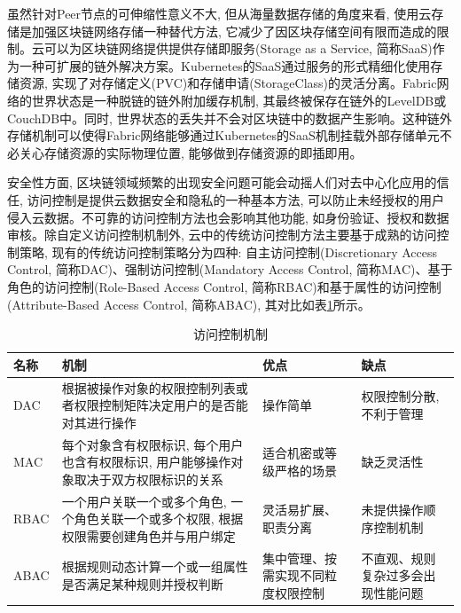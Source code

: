 虽然针对Peer节点的可伸缩性意义不大, 但从海量数据存储的角度来看, 使用云存储是加强区块链网络存储一种替代方法, 它减少了因区块存储空间有限而造成的限制\cite{gai2020blockchain}。云可以为区块链网络提供提供存储即服务(Storage as a Service, 简称SaaS)作为一种可扩展的链外解决方案。Kubernetes的SaaS通过服务的形式精细化使用存储资源, 实现了对存储定义(PVC)和存储申请(StorageClass)的灵活分离。Fabric网络的世界状态是一种脱链的链外附加缓存机制, 其最终被保存在链外的LevelDB或CouchDB中。同时, 世界状态的丢失并不会对区块链中的数据产生影响。这种链外存储机制可以使得Fabric网络能够通过Kubernetes的SaaS机制挂载外部存储单元不必关心存储资源的实际物理位置, 能够做到存储资源的即插即用。 

安全性方面, 区块链领域频繁的出现安全问题可能会动摇人们对去中心化应用的信任, 访问控制是提供云数据安全和隐私的一种基本方法, 可以防止未经授权的用户侵入云数据。不可靠的访问控制方法也会影响其他功能, 如身份验证、授权和数据审核。除自定义访问控制机制外, 云中的传统访问控制方法主要基于成熟的访问控制策略, 现有的传统访问控制策略分为四种: 自主访问控制(Discretionary Access Control, 简称DAC)、强制访问控制(Mandatory Access Control, 简称MAC)、基于角色的访问控制(Role-Based Access Control, 简称RBAC)和基于属性的访问控制(Attribute-Based Access Control, 简称ABAC), 其对比如表\ref{access_control}所示。

{\footnotesize
\begin{longtable}[h]{m{20pt} m{200pt} m{60pt} m{60pt}}
    \caption[访问控制机制]{访问控制机制} \label{access_control} \\
        \toprule  
        \textbf{名称}&\textbf{机制}&\textbf{优点}&\textbf{缺点}\\
        \hline
        DAC & 根据被操作对象的权限控制列表或者权限控制矩阵决定用户的是否能对其进行操作 & 操作简单 & 权限控制分散, 不利于管理 \\

        MAC & 每个对象含有权限标识, 每个用户也含有权限标识, 用户能够操作对象取决于双方权限标识的关系 & 适合机密或等级严格的场景 & 缺乏灵活性 \\

        RBAC & 一个用户关联一个或多个角色, 一个角色关联一个或多个权限, 根据权限需要创建角色并与用户绑定 & 灵活易扩展、职责分离 & 未提供操作顺序控制机制 \\

        ABAC & 根据规则动态计算一个或一组属性是否满足某种规则并授权判断 & 集中管理、按需实现不同粒度权限控制 & 不直观、规则复杂过多会出现性能问题 \\
        \bottomrule
    \end{longtable}
}


